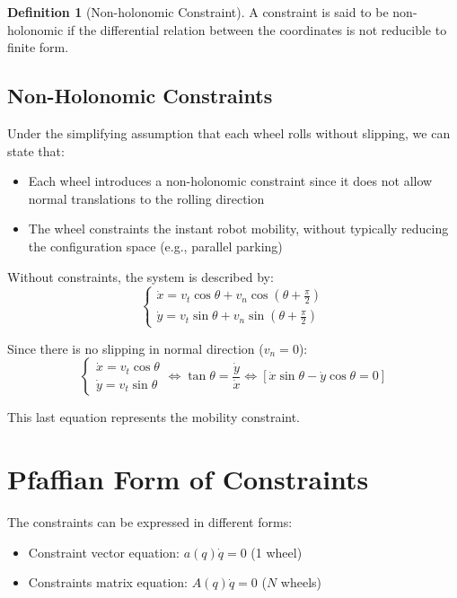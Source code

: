 \documentclass[openany]{book}
\theoremstyle{definition}
\newtheorem{definition}{Definition}[section]
\theoremstyle{remark}
\begin{document}
\begin{definition}[Non-holonomic Constraint]
A constraint is said to be non-holonomic if the differential relation between the coordinates is not reducible to finite form.
\end{definition}

\subsection{Non-Holonomic Constraints}

Under the simplifying assumption that each wheel rolls without slipping, we can state that:
\begin{itemize}
    \item Each wheel introduces a non-holonomic constraint since it does not allow normal translations to the rolling direction
    \item The wheel constraints the instant robot mobility, without typically reducing the configuration space (e.g., parallel parking)
\end{itemize}

Without constraints, the system is described by:
\begin{equation}
    \begin{cases}
    \dot{x} = v_t \cos\theta + v_n \cos(\theta + \frac{\pi}{2}) \\
    \dot{y} = v_t \sin\theta + v_n \sin(\theta + \frac{\pi}{2})
    \end{cases}
\end{equation}

Since there is no slipping in normal direction ($v_n = 0$):
\begin{equation}
    \begin{cases}
    \dot{x} = v_t \cos\theta \\
    \dot{y} = v_t \sin\theta
    \end{cases}
    \Leftrightarrow \tan\theta = \frac{\dot{y}}{\dot{x}}
    \Leftrightarrow [\dot{x}\sin\theta - \dot{y}\cos\theta = 0]
\end{equation}

This last equation represents the mobility constraint.

\section{Pfaffian Form of Constraints}

The constraints can be expressed in different forms:
\begin{itemize}
    \item Constraint vector equation: $a(q)\dot{q} = 0$ (1 wheel)
    \item Constraints matrix equation: $A(q)\dot{q} = 0$ ($N$ wheels)
\end{itemize}
\end{document}

